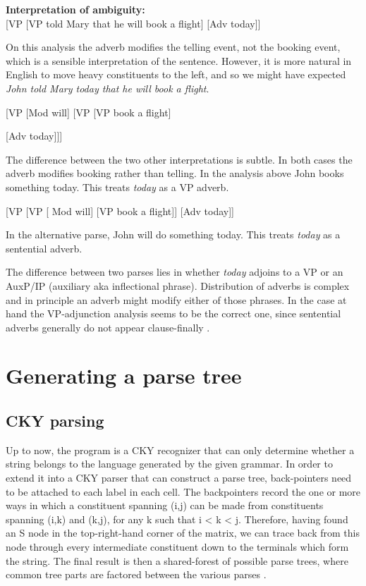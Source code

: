 \documentclass{article}
\begin{document}
\textbf{Interpretation of ambiguity:}\\
{[}VP {[}VP told Mary that he will book a flight{]} {[}Adv today{]}{]}

On this analysis the adverb modifies the telling event, not the booking event, which is	a sensible interpretation of the sentence. However, it is more natural in English to move heavy constituents to the left, and so we might have expected \emph{John told Mary today that he will book a flight}.

{[}VP {[}Mod will{]} {[}VP {[}VP book a flight{]} {[Adv today{]}{]}{]}

The difference between the two other interpretations is subtle. In both cases the adverb modifies booking rather than telling. In the analysis above John books something today. This treats \emph{today} as a VP adverb.

{[}VP {[}VP {[} Mod will{]} {[}VP book a flight{]}{]} {[}Adv today{]}{]}

In the alternative parse, John will do something today. This treats \emph{today} as a sentential adverb.

The difference between two parses lies in whether \emph{today} adjoins to a VP or an AuxP/IP (auxiliary aka inflectional phrase). Distribution of adverbs is complex and in principle an adverb might modify either of those phrases. In the case at hand the VP-adjunction analysis seems to be the correct one, since sentential adverbs generally do not appear clause-finally \cite{potsdam1998adverbs}. 




\section{Generating a parse tree}

\subsection{CKY parsing}

Up to now, the program is a CKY recognizer that can only determine whether a string belongs to the language generated by the given grammar. In order to extend it into a CKY parser that can construct a parse tree, back-pointers need to be attached to each label in each cell. The backpointers record the one or more ways in which a constituent spanning (i,j) can be made from constituents spanning (i,k) and (k,j), for any k such that i < k < j.  Therefore, having found an S node in the top-right-hand corner of the matrix, we can trace back from this node through every intermediate constituent down to the  terminals which form the string. The final result is then a shared-forest of possible parse trees, where common tree parts are factored between the various parses \cite{lang1994recognition}.

}
\end{document}
